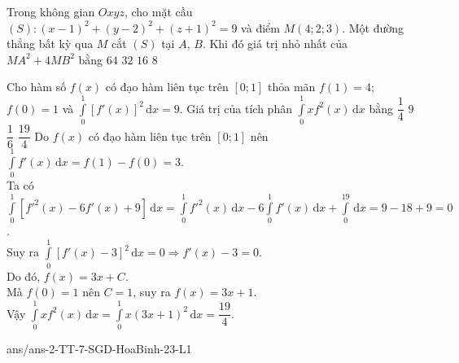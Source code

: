 \begin{ex}%
	Trong không gian $Oxyz$, cho mặt cầu $(S)\colon (x-1)^2+(y-2)^2+(z+1)^2=9$ và điểm $M(4;2;3)$. Một đường thẳng bất kỳ qua $M$ cắt $(S)$ tại $A$, $B$. Khi đó giá trị nhỏ nhất của $MA^2+4MB^2$ bằng
	\choice
	{\True $64$}
	{$32$}
	{$16$}
	{$8$}
\end{ex}
\begin{ex}%
	Cho hàm số $f(x)$ có đạo hàm liên tục trên $[0;1]$ thỏa mãn $f(1)=4$; $f(0)=1$ và $\displaystyle\int\limits_0^1\left[f'(x)\right]^2\mathrm{\,d}x=9$. Giá trị của tích phân $\displaystyle\int\limits_0^1xf^2(x)\mathrm{\,d}x$ bằng
	\choice
	{$\dfrac{1}{4}$}
	{$9$}
	{$\dfrac{1}{6}$}
	{\True $\dfrac{19}{4}$}
	\loigiai
	{
	Do $f(x)$ có đạo hàm liên tục trên $[0;1]$ nên $\displaystyle\int\limits_0^1f'(x)\mathrm{\,d}x=f(1)-f(0)=3$.\\
Ta có $\displaystyle\int\limits_0^1\left[f'^2(x)-6f'(x)+9\right]\mathrm{\,d}x=\displaystyle\int\limits_0^1f'^2(x)\mathrm{\,d}x-6\displaystyle\int\limits_0^1f'(x)\mathrm{\,d}x+\displaystyle\int\limits_0^19\mathrm{\,d}x=9-18+9=0$.\\
Suy ra $\displaystyle\int\limits_0^1\left[f'(x)-3\right]^2\mathrm{\,d}x=0\Rightarrow f'(x)-3=0$.\\
Do đó, $f(x)=3x+C$.\\
Mà $f(0)=1$ nên $C=1$, suy ra $f(x)=3x+1$.\\
Vậy $\displaystyle\int\limits_0^1xf^2(x)\mathrm{\,d}x=\displaystyle\int\limits_0^1x(3x+1)^2\mathrm{\,d}x=\dfrac{19}{4}$.
}
\end{ex}
\begin{indapan}{10}
	{ans/ans-2-TT-7-SGD-HoaBinh-23-L1}
\end{indapan}


